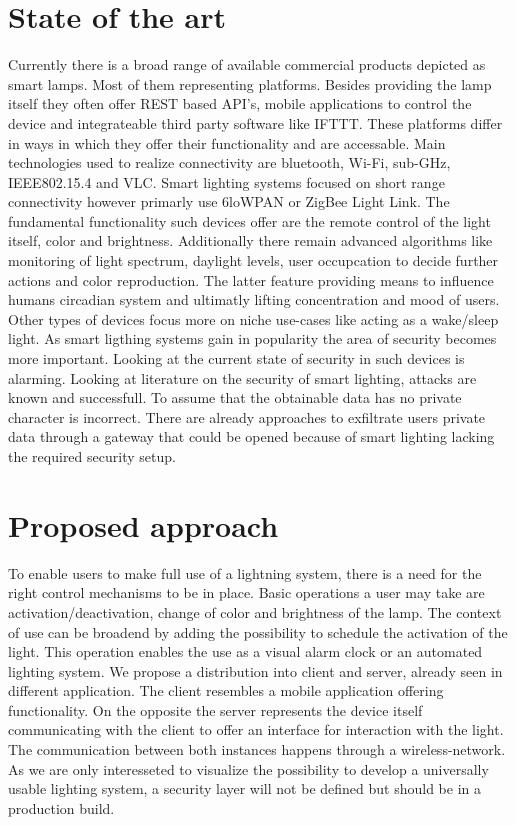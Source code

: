 \documentclass[conference]{IEEEtran}
\begin{document}
\section{State of the art}
Currently there is a broad range of available commercial products depicted as smart lamps. Most of them representing platforms.
Besides providing the lamp itself they often offer REST based API's, mobile applications to control the device and integrateable
third party software like IFTTT. These platforms differ in ways in which they offer their functionality and are accessable.
Main technologies used to realize connectivity are bluetooth, Wi-Fi, sub-GHz, IEEE802.15.4 and VLC. Smart lighting systems
focused on short range connectivity however primarly use 6loWPAN or ZigBee Light Link. The fundamental functionality such
devices offer are the remote control of the light itself, color and brightness. Additionally there remain advanced algorithms
like monitoring of light spectrum, daylight levels, user occupcation to decide further actions and color reproduction. The latter
feature providing means to influence humans circadian system and ultimatly lifting concentration and mood of users.\cite{higuera2018} 
Other types of devices focus more on niche use-cases like \cite{nur2018,philips19} acting as a wake/sleep light. As smart ligthing
systems gain in popularity the area of security becomes more important. Looking at the current state of security in such devices is
alarming. Looking at literature on the security of smart lighting, attacks are known and successfull. \cite{Morgner2017,Eichelberger2015} 
To assume that the obtainable data has no private character is incorrect. There are already approaches to exfiltrate 
users private data through a gateway that could be opened because of smart lighting lacking the required security setup. \cite{Maiti2018}

\section{Proposed approach}
To enable users to make full use of a lightning system, there is a need for the right control mechanisms to be in place.
Basic operations a user may take are activation/deactivation, change of color and brightness of the lamp. The context of use can
be broadend by adding the possibility to schedule the activation of the light. This operation enables the use as a visual alarm
clock or an automated lighting system. 
We propose a distribution into client and server, already seen in different application. The client resembles a mobile application
offering functionality. On the opposite the server represents the device itself communicating with the client to offer an interface for
interaction with the light.
The communication between both instances happens through a wireless-network. As we are only interesseted to visualize the possibility 
to develop a universally usable lighting system, a security layer will not be defined but should be in a production build. 
\end{document}
